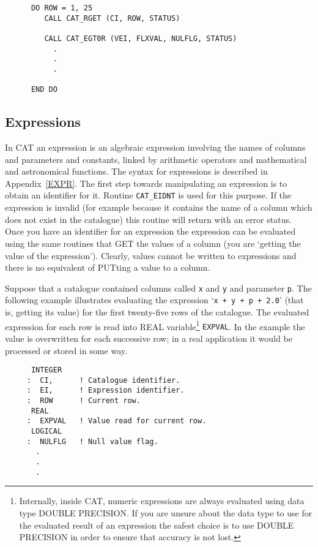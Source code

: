 \begin{verbatim}
      DO ROW = 1, 25
         CALL CAT_RGET (CI, ROW, STATUS)

         CALL CAT_EGT0R (VEI, FLXVAL, NULFLG, STATUS)
           .
           .
           .

      END DO
\end{verbatim}


\subsection{Expressions}

In CAT an expression is an algebraic expression involving the names of
columns and parameters and constants, linked by arithmetic operators and
mathematical and astronomical functions. The syntax for expressions is
described in Appendix~\ref{EXPR}. The first step towards manipulating an
expression is to obtain an identifier for it. Routine {\tt CAT\_EIDNT}
is used for this purpose. If the expression is invalid (for example
because it contains the name of a column which does not exist in the
catalogue) this routine will return with an error status. Once you have
an identifier for an expression the expression can be evaluated using
the same routines that GET the values of a column (you are `getting the
value of the expression'). Clearly, values cannot be written to 
expressions and there is no equivalent of PUTting a value to a column.

Suppose that a catalogue contained columns called {\tt x} and {\tt y}
and parameter {\tt p}. The following example illustrates evaluating the 
expression `{\tt x + y + p + 2.0}' (that is, getting its value) for the 
first twenty-five rows of the catalogue. The evaluated expression for 
each row is read into REAL variable\footnote{Internally, inside CAT, 
numeric expressions are always evaluated using data type DOUBLE 
PRECISION. If you are unsure about the data type to use for the 
evaluated result of an expression the safest choice is to use DOUBLE 
PRECISION in order to ensure that accuracy is not lost.} {\tt EXPVAL}. 
In the example the value is overwritten for each successive row; in a 
real application it would be processed or stored in some way.

\begin{verbatim}
      INTEGER
     :  CI,      ! Catalogue identifier.
     :  EI,      ! Expression identifier.
     :  ROW      ! Current row.
      REAL
     :  EXPVAL   ! Value read for current row.
      LOGICAL
     :  NULFLG   ! Null value flag.
       .
       .
       .
\end{verbatim}

